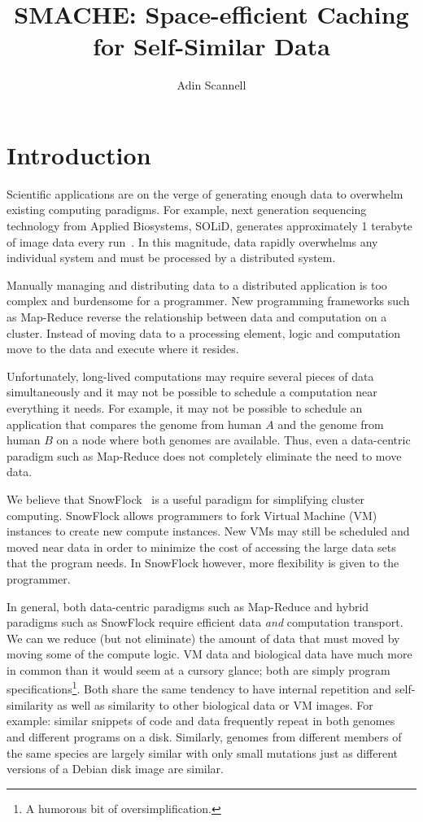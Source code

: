 \documentclass{article}[12pt]
\begin{document}
\thispagestyle{empty}
\pagestyle{plain}

\author{Adin Scannell}
\title{SMACHE: Space-efficient Caching for Self-Similar Data}
\maketitle

\section{Introduction}

Scientific applications are on the verge of generating enough data to overwhelm
existing computing paradigms.  For example, next generation sequencing
technology from Applied Biosystems, SOLiD, generates approximately 1 terabyte
of image data every run~\cite{ab}.  In this magnitude, data rapidly overwhelms
any individual system and must be processed by a distributed system.

Manually managing and distributing data to a distributed application is too
complex and burdensome for a programmer.  New programming frameworks such as
Map-Reduce reverse the relationship between data and computation on a cluster.
Instead of moving data to a processing element, logic and computation move to
the data and execute where it resides.

Unfortunately, long-lived computations may require several pieces of data
simultaneously and it may not be possible to schedule a computation near
everything it needs.  For example, it may not be possible to schedule an
application that compares the genome from human $A$ and the genome from human
$B$ on a node where both genomes are available.  Thus, even a data-centric
paradigm such as Map-Reduce does not completely eliminate the need to move
data.

We believe that SnowFlock~\cite{snowflock} is a useful paradigm for simplifying
cluster computing.  SnowFlock allows programmers to fork Virtual Machine (VM)
instances to create new compute instances.  New VMs may still be scheduled and
moved near data in order to minimize the cost of accessing the large data sets
that the program needs.  In SnowFlock however, more flexibility is given to the
programmer.

In general, both data-centric paradigms such as Map-Reduce and hybrid paradigms
such as SnowFlock require efficient data {\em and} computation transport.  We
can we reduce (but not eliminate) the amount of data that must moved by moving
some of the compute logic.  VM data and biological data have much more in
common than it would seem at a cursory glance; both are simply program
specifications\footnote{A humorous bit of oversimplification.}.  Both share
the same tendency to have internal repetition and self-similarity as well as
similarity to other biological data or VM images.  For example: similar snippets
of code and data frequently repeat in both genomes~\cite{biosequence} and
different programs on a disk.  Similarly, genomes from different members of the
same species are largely similar with only small mutations just as different
versions of a Debian disk image are similar.
\end{document}
